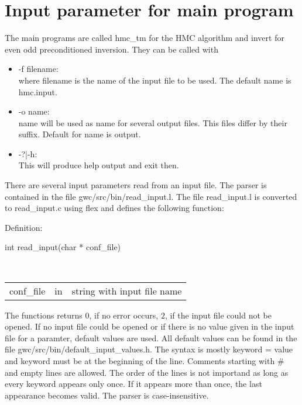 \section{Input parameter for main program}

The main programs are called {\ttfamily hmc\_tm} for the HMC algorithm
and {\ttfamily invert} for even odd preconditioned inversion. They can
be called with
\begin{itemize}
\item {\ttfamily -f filename}:\\
  where {\ttfamily filename} is the name of the input file to be
  used. The default name is {\ttfamily hmc.input}.

\item {\ttfamily -o name}:\\
  {\ttfamily name} will be used as name for several output files. This
  files differ by their suffix. Default for {\ttfamily name} is
  {\ttfamily output}.

\item {\ttfamily -?|-h}:\\
  This will produce help output and exit then.
  
\end{itemize}

There are several input parameters read from an input file. The parser is contained in the file {\ttfamily gwc/src/bin/read\_input.l}. The file {\ttfamily read\_input.l} is converted to {\ttfamily read\_input.c} using {\ttfamily flex} and defines the following function:

Definition:\\
\begin{ttfamily}
  int read\_input(char * conf\_file)
\end{ttfamily}\\

\begin{tabular}[h]{l l l}
{\ttfamily conf\_file} & in & string with input file name\\ 
\end{tabular}

The functions returns $0$, if no error occurs, $2$, if the input file
could not be opened. If no input file could be opened or if there is
no value given in the input file for a paramter, default values are
used. All default values can be found in the file {\ttfamily
  gwc/src/bin/default\_input\_values.h}. The syntax is mostly
{\ttfamily keyword = value} and {\ttfamily keyword} must be at the
beginning of the line. Comments starting with {\ttfamily \#} and empty
lines are allowed. The order of the lines is not importand as long as
every keyword appears only once.  If it appears more than once, the
last appearance becomes valid. The parser is case-insensitive.

